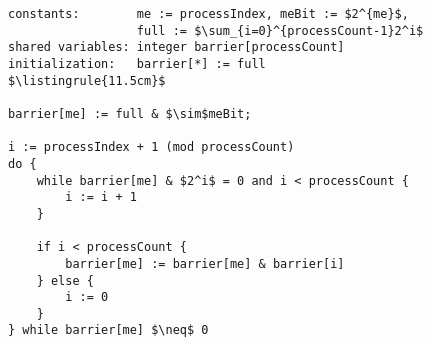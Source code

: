 \begin{minipage}
\centering
\begin{lstlisting}[mathescape, linewidth=11.5cm]
constants:        me := processIndex, meBit := $2^{me}$,
                  full := $\sum_{i=0}^{processCount-1}2^i$
shared variables: integer barrier[processCount]
initialization:   barrier[*] := full
$\listingrule{11.5cm}$

barrier[me] := full & $\sim$meBit;

i := processIndex + 1 (mod processCount)
do {
	while barrier[me] & $2^i$ = 0 and i < processCount {
		i := i + 1
	}

	if i < processCount {
		barrier[me] := barrier[me] & barrier[i]
	} else {
		i := 0
	}
} while barrier[me] $\neq$ 0
\end{lstlisting}
\end{minipage}
